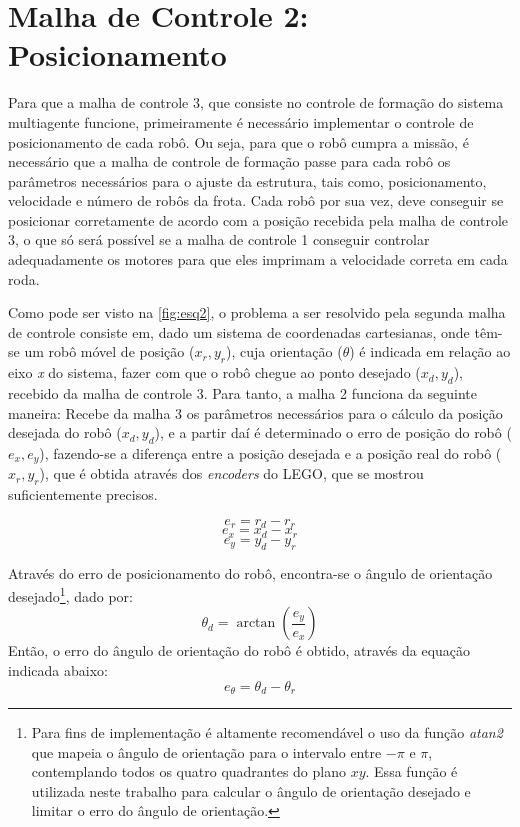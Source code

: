 \section{Malha de Controle 2: Posicionamento}
\label{sec:malha2 } 
Para que a malha de controle 3, que consiste no controle de formação do sistema multiagente funcione, primeiramente é necessário implementar o controle de posicionamento de cada robô. Ou seja, para que o robô cumpra a missão, é necessário que a malha de controle de formação passe para cada robô os parâmetros necessários para o ajuste da estrutura, tais como, posicionamento, velocidade e número de robôs da frota. Cada robô por sua vez, deve conseguir se posicionar corretamente de acordo com a posição recebida pela malha de controle 3, o que só será possível se a malha de controle 1 conseguir controlar adequadamente os motores para que eles imprimam a velocidade correta em cada roda.

Como pode ser visto na \autoref{fig:esq2}, o problema a ser resolvido pela segunda malha de controle consiste em, dado um sistema de coordenadas cartesianas, onde têm-se um robô móvel de posição (\emph{$x_{r},y_{r}$}), cuja orientação (\emph{$\theta$}) é indicada em relação ao eixo \emph{x} do sistema, %
fazer com que o robô chegue ao ponto desejado (\emph{$x_{d},y_{d}$}), recebido da malha de controle 3. Para tanto, a malha 2 funciona da seguinte maneira: Recebe da malha 3 os parâmetros necessários para o cálculo da posição desejada do robô (\emph{$x_{d},y_{d}$}), e a partir daí é determinado o erro de posição do robô (\emph{$e_{x},e_{y}$}), fazendo-se a diferença entre a posição desejada e a posição real do robô (\emph{$x_{r},y_{r}$}), que é obtida através dos \emph{encoders} do LEGO\textregistered, que se mostrou suficientemente precisos.

\begin{equation}
e_{r} = r_{d} - r_{r}
\label{eq:errr}
\end{equation}
\begin{equation}
e_{x} = x_{d} - x_{r}
\label{eq:errx}
\end{equation}
\begin{equation}
e_{y} = y_{d} - y_{r}
\label{eq:erry}
\end{equation}

Através do erro de posicionamento do robô, encontra-se o ângulo de orientação desejado\footnote{Para fins de implementação é altamente recomendável o uso da função \emph{atan2} que mapeia o ângulo de orientação para o intervalo entre $-\pi$ e $\pi$, contemplando todos os quatro quadrantes do plano $xy$. Essa função é utilizada neste trabalho para calcular o ângulo de orientação desejado e limitar o erro do ângulo de orientação.}, dado por: %
\begin{equation}
\theta_{d} = \arctan\left(\dfrac{e_{y}}{e_{x}}\right)
\label{eq:thetad}
\end{equation}
Então, o erro do ângulo de orientação do robô é obtido, através da %
equação indicada abaixo: 
\begin{equation}
e_{\theta} = \theta_{d} - \theta_{r}
\label{eq:errtheta}
\end{equation}

